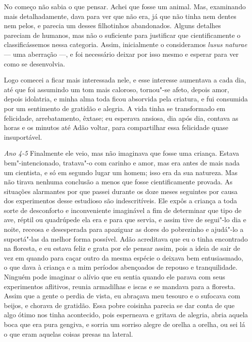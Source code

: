 No começo não sabia o que pensar. Achei que fosse um animal. Mas,
examinando mais detalhadamente, dava para ver que não era, já que não tinha nem
dentes nem pelos, e parecia um desses filhotinhos abandonados. Alguns detalhes
pareciam de humanos, mas não o suficiente para justificar que cientificamente o
classificássemos nessa categoria. Assim, inicialmente o consideramos
\textit{lusus naturae} --- uma aberração ---, e foi necessário deixar por
isso mesmo e esperar para ver como se desenvolvia.

Logo comecei a ficar mais interessada nele, e esse interesse aumentava a cada
dia, até que foi assumindo um tom mais caloroso, tornou"-se afeto, depois
amor, depois idolatria, e minha alma toda ficou absorvida pela criatura, e fui
consumida por um sentimento de gratidão e alegria. A vida tinha se transformado em
felicidade, arrebatamento, êxtase; eu esperava ansiosa, dia após dia, contava as horas e
os minutos até Adão voltar, para compartilhar essa
felicidade quase insuportável.

\textit{Ano 4-5} Finalmente ele veio, mas não imaginava que fosse uma criança. Estava
bem"-intencionado, tratava"-o com carinho e amor, mas era antes de mais
nada um cientista, e só em segundo lugar um homem; isso era da sua natureza. Mas não
tirava nenhuma conclusão a menos que fosse cientificamente provada. As
situações alarmantes por que passei durante os doze meses seguintes por causa dos
experimentos desse estudioso são indescritíveis. Ele expôs a criança a toda
sorte de desconforto e inconveniente imaginável a fim de determinar que tipo de
ave, réptil ou quadrúpede ela era e para que servia, e assim tive de segui"-lo
dia e noite, receosa e desesperada para apaziguar as dores do pobrezinho e ajudá"-lo a
suportá"-las da melhor forma possível. Adão acreditava que eu o tinha encontrado na
floresta, e eu estava feliz e grata por ele pensar assim, pois a ideia de
sair de vez em quando para caçar outro da mesma espécie o deixava bem
entusiasmado, o que dava à criança e a mim períodos abençoados de repouso e
tranquilidade. Ninguém pode imaginar o alívio que eu sentia quando ele parava com
seus experimentos aflitivos, reunia armadilhas e iscas e se mandava para a
floresta. Assim que a gente o perdia de vista, eu abraçava meu tesouro e o
sufocava com beijos, e chorava de gratidão. Essa pobre coisinha parecia se dar
conta de que algo ótimo nos tinha acontecido, pois esperneava e gritava de alegria,
abria aquela boca que era pura gengiva, e sorria um sorriso alegre de orelha a
orelha, ou sei lá o que eram aquelas coisas presas na lateral.

